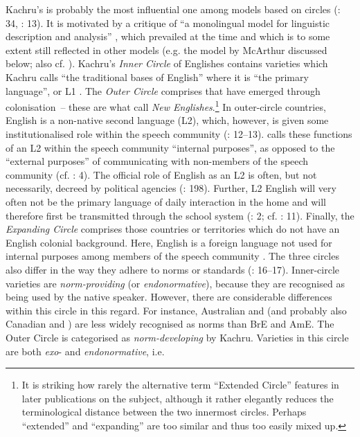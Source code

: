 Kachru’s is probably the most influential one among models based on circles (\citealt{Werner2014}: 34, \citealt{Jenkins2015}: 13). It is motivated by a critique of “a monolingual model for linguistic description and analysis” \citep[11]{Kachru1985}, which prevailed at the time and which is to some extent still reflected in other models (e.g. the model by McArthur discussed below; also cf. \citealt{Görlach1990}). Kachru’s \textit{Inner Circle} of Englishes contains varieties which Kachru calls “the traditional bases of English” where it is “the primary language”, or L1 \citep[12]{Kachru1985}. The \textit{Outer Circle} comprises  that have emerged through colonisation~– these are what \citet[3–4]{PlattEtAl1984} call \textit{New Englishes}.\footnote{It is striking how rarely the alternative term “Extended Circle” features in later publications on the subject, although it rather elegantly reduces the terminological distance between the two innermost circles. Perhaps “extended” and “expanding” are too similar and thus too easily mixed up.} In outer-circle countries, English is a non-native second language (L2), which, however, is given some institutionalised role within the speech community (\citealt{Kachru1985}: 12–13). \citet[4]{Quirk1985} calls these functions of an L2 within the speech community “internal purposes”, as opposed to the “external purposes” of communicating with non-members of the speech community (cf. \citealt{Greenbaum1996}: 4). The official role of English as an L2 is often, but not necessarily, decreed by political agencies (\citealt{PlattWeberHo1984}: 198). Further, L2 English will very often not be the primary language of daily interaction in the home and will therefore first be transmitted through the school system (\citealt{PlattWeberHo1984}: 2; cf. \citealt{MesthrieBhatt2008}: 11). Finally, the \textit{Expanding Circle} comprises those countries or territories which do not have an English colonial background. Here, English is a foreign language not used for internal purposes among members of the speech community \citep[13]{Kachru1985}. The three circles also differ in the way they adhere to norms or standards (\citealt{Kachru1985}: 16–17). Inner-circle varieties are \textit{norm-providing} (or \textit{endonormative}), because they are recognised as being used by the native speaker. However, there are considerable differences within this circle in this regard. For instance, Australian and  (and probably also Canadian and ) are less widely recognised as norms than BrE and AmE. The Outer Circle is categorised as \textit{norm-developing} by Kachru. Varieties in this circle are both \textit{exo}- and \textit{endonormative}, i.e. 